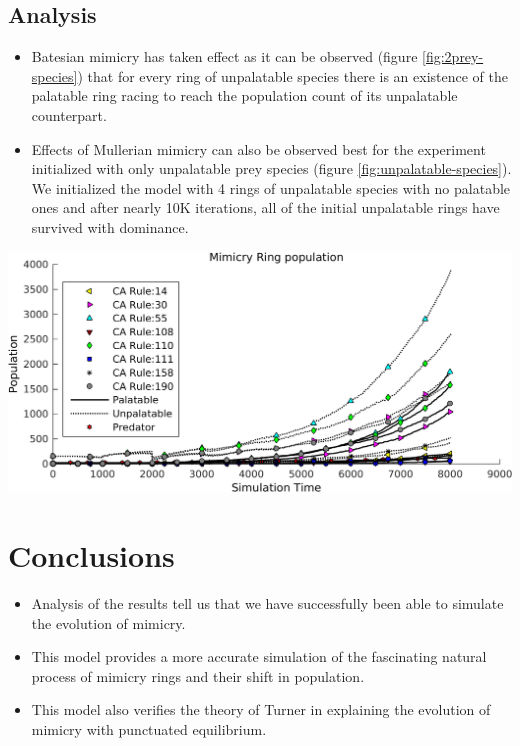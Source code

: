 \documentclass[a0,portrait]{a0poster}
\begin{document}
\begin{multicols}{2}
\color{SaddleBrown} 
\subsection*{Analysis}
\begin{itemize}
\item Batesian mimicry has taken effect as it can be observed (figure \ref{fig:2prey-species}) that for every ring of unpalatable species there is an existence of the palatable ring racing to reach the population count of its unpalatable counterpart.
\item Effects of Mullerian mimicry can also be observed best for the experiment initialized with only unpalatable prey species (figure \ref{fig:unpalatable-species}). We initialized the model with 4 rings of unpalatable species with no palatable ones and after nearly 10K iterations, all of the initial unpalatable rings have survived with dominance. 
\end{itemize}

\begin{center}\vspace{1cm}
\includegraphics[width=0.8\linewidth]{simTime8k-4Prey-unp.png}
\label{fig:unpalatable-species}
\end{center}\vspace{1cm}

\color{DarkSlateGray}
\section*{Conclusions}
\begin{itemize}
\item Analysis of the results tell us that we have successfully been able to simulate the evolution of mimicry.
\item This model provides a more accurate simulation of the fascinating natural process of mimicry rings and their shift in population. 
\item This model also verifies the theory of Turner in explaining the evolution of mimicry with punctuated equilibrium.
\end{itemize}


\end{multicols}
\end{document}
